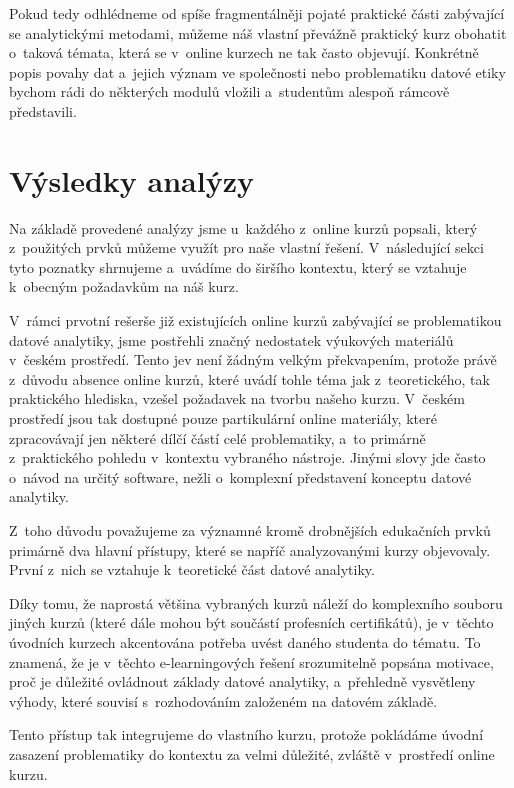 Pokud tedy odhlédneme od spíše fragmentálněji pojaté praktické části zabývající se analytickými metodami, můžeme náš vlastní převážně praktický kurz obohatit o~taková témata, která se v~online kurzech ne tak často objevují. Konkrétně popis povahy dat a~jejich význam ve společnosti nebo problematiku datové etiky bychom rádi do některých modulů vložili a~studentům alespoň rámcově představili.

\hypertarget{vuxfdsledky-analuxfdzy}{%
\section{Výsledky analýzy}\label{vuxfdsledky-analuxfdzy}}

Na základě provedené analýzy jsme u~každého z~online kurzů popsali, který z~použitých prvků můžeme využít pro naše vlastní řešení. V~následující sekci tyto poznatky shrnujeme a~uvádíme do širšího kontextu, který se vztahuje k~obecným požadavkům na náš kurz.

V~rámci prvotní rešerše již existujících online kurzů zabývající se problematikou datové analytiky, jsme postřehli značný nedostatek výukových materiálů v~českém prostředí. Tento jev není žádným velkým překvapením, protože právě z~důvodu absence online kurzů, které uvádí tohle téma jak z~teoretického, tak praktického hlediska, vzešel požadavek na tvorbu našeho kurzu. V~českém prostředí jsou tak dostupné pouze partikulární online materiály, které zpracovávají jen některé dílčí částí celé problematiky, a~to primárně z~praktického pohledu v~kontextu vybraného nástroje. Jinými slovy jde často o~návod na určitý software, nežli o~komplexní představení konceptu datové analytiky.

Z~toho důvodu považujeme za významné kromě drobnějších edukačních prvků primárně dva hlavní přístupy, které se napříč analyzovanými kurzy objevovaly. První z~nich se vztahuje k~teoretické část datové analytiky.

Díky tomu, že naprostá většina vybraných kurzů náleží do komplexního souboru jiných kurzů (které dále mohou být součástí profesních certifikátů), je v~těchto úvodních kurzech akcentována potřeba uvést daného studenta do tématu. To znamená, že je v~těchto e-learningových řešení srozumitelně popsána motivace, proč je důležité ovládnout základy datové analytiky, a~přehledně vysvětleny výhody, které souvisí s~rozhodováním založeném na datovém základě.

Tento přístup tak integrujeme do vlastního kurzu, protože pokládáme úvodní zasazení problematiky do kontextu za velmi důležité, zvláště v~prostředí online kurzu.
